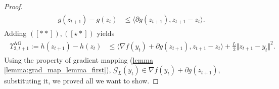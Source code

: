 \documentclass[12pt]{article}
\begin{document}
\begin{proof}
\begin{align*}
\begin{aligned}
                    g(z_{t + 1}) - g(z_t)
                    &\le 
                    \langle 
                        \partial g (z_{t +1}), 
                        z_{t + 1} - z_t
                    \rangle. 
                \end{aligned}
                \tag{$[\star *]$}    
            \end{align*}
            Adding $([**]), ([\star *])$ yields 
            \begin{align*}
                \begin{aligned}
                    \Upsilon_{2, t + 1}^{\text{AG}} := 
                    h(z_{t + 1}) - h(z_t) 
                    &\le 
                    \langle 
                        \nabla f(y_t) + \partial g(z_{t+1}), 
                        z_{t + 1} - z_t
                    \rangle + 
                    \frac{L}{2}
                    \Vert 
                        z_{t + 1} - y_t
                    \Vert^2. 
                \end{aligned}
            \end{align*}
            Using the property of gradient mapping (\hyperref[lemma:grad_map_lemma_first]
                {lemma \ref*{lemma:grad_map_lemma_first}}), 
            $\mathcal G_L(y_t) \in \nabla f(y_t) + \partial g(z_{t + 1})$, substituting it, we proved all we want to show. 
        \end{proof}
\end{document}
